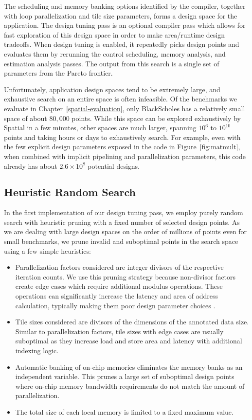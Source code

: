 The scheduling and memory banking options identified by the compiler, together with loop parallelization and tile size parameters, forms a design space for the application.
The design tuning pass is an optional compiler pass which allows for fast exploration of this design space in order to make area/runtime design tradeoffs.
When design tuning is enabled, it repeatedly picks design points and evaluates them by rerunning the control scheduling, memory analysis, and estimation analysis passes. The output from this search is a single set of parameters from the Pareto frontier.

Unfortunately, application design spaces tend to be extremely large, and exhaustive search on an entire space is often infeasible. Of the benchmarks we evaluate in Chapter~\ref{spatial-evaluation},
only BlackScholes has a relatively small space of about $80,000$ points. While this space can be explored exhaustively by Spatial in a few minutes, other spaces are much larger, spanning $10^6$ to $10^{10}$ points and
taking hours or days to exhaustively search. For example, even with the few explicit design parameters exposed in the code in Figure~\ref{fig:matmult}, when combined with implicit pipelining and parallelization parameters, this code already has about $2.6\times10^8$ potential designs.

\subsection{Heuristic Random Search}
In the first implementation of our design tuning pass, we employ purely
random search with heuristic pruning with a fixed number of selected design points.
As we are dealing with large design spaces on the order of millions of points even for small benchmarks,
we prune invalid and suboptimal points in the search space using a few simple heuristics:
\begin{itemize}
  \item Parallelization factors considered are integer divisors of the respective iteration counts. We use this pruning strategy because non-divisor factors create edge cases which require additional modulus operations. These operations can significantly increase the latency and area of address calculation, typically making them poor design parameter choices \cite{raghus-paper}.
  \item Tile sizes considered are divisors of the dimensions of the annotated data size. Similar to parallelization factors, tile sizes with edge cases are usually suboptimal as they increase load and store area and latency with additional indexing logic.
  \item Automatic banking of on-chip memories eliminates the memory banks as an independent variable. This prunes a large set of suboptimal design points where on-chip memory bandwidth requirements do not match the amount of parallelization.
  \item The total size of each local memory is limited to a fixed maximum value.
\end{itemize}

